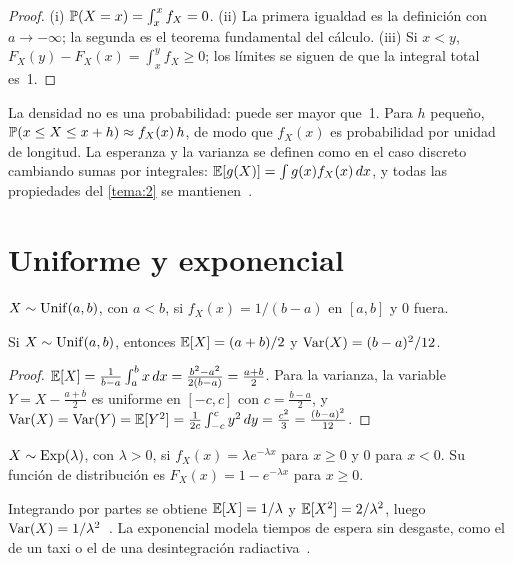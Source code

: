 \begin{proof}
(i) $\mathbb{P}(X=x)=\int_x^x f_X=0$. (ii) La primera igualdad es la definición con $a\to-\infty$; la segunda es el teorema fundamental del cálculo. (iii) Si $x<y$, $F_X(y)-F_X(x)=\int_x^y f_X\ge 0$; los límites se siguen de que la integral total es~1.
\end{proof}

La densidad no es una probabilidad: puede ser mayor que~1. Para $h$ pequeño, $\mathbb{P}(x\le X\le x+h)\approx f_X(x)\,h$, de modo que $f_X(x)$ es probabilidad por unidad de longitud. La esperanza y la varianza se definen como en el caso discreto cambiando sumas por integrales: $\mathbb{E}[g(X)]=\int g(x)f_X(x)\,dx$, y todas las propiedades del \cref{tema:2} se mantienen~\cite[§3.1]{bt}.

\section{Uniforme y exponencial}

\begin{definicion}[Uniforme]
$X\sim\operatorname{Unif}(a,b)$, con $a<b$, si $f_X(x)=1/(b-a)$ en $[a,b]$ y $0$ fuera.
\end{definicion}

\begin{proposicion}\label{prop:uniforme}
Si $X\sim\operatorname{Unif}(a,b)$, entonces $\mathbb{E}[X]=(a+b)/2$ y $\operatorname{Var}(X)=(b-a)^{2}/12$.
\end{proposicion}

\begin{proof}
$\mathbb{E}[X]=\frac{1}{b-a}\int_a^b x\,dx=\frac{b^{2}-a^{2}}{2(b-a)}=\frac{a+b}{2}$. Para la varianza, la variable $Y=X-\frac{a+b}{2}$ es uniforme en $[-c,c]$ con $c=\frac{b-a}{2}$, y $\operatorname{Var}(X)=\operatorname{Var}(Y)=\mathbb{E}[Y^{2}]=\frac{1}{2c}\int_{-c}^{c}y^{2}\,dy=\frac{c^{2}}{3}=\frac{(b-a)^{2}}{12}$.
\end{proof}

\begin{definicion}[Exponencial]
$X\sim\operatorname{Exp}(\lambda)$, con $\lambda>0$, si $f_X(x)=\lambda e^{-\lambda x}$ para $x\ge 0$ y $0$ para $x<0$. Su función de distribución es $F_X(x)=1-e^{-\lambda x}$ para $x\ge 0$.
\end{definicion}

Integrando por partes se obtiene $\mathbb{E}[X]=1/\lambda$ y $\mathbb{E}[X^{2}]=2/\lambda^{2}$, luego $\operatorname{Var}(X)=1/\lambda^{2}$~\cite[§3.1]{bt}. La exponencial modela tiempos de espera sin desgaste, como el de un taxi o el de una desintegración radiactiva~\cite[clase~5c]{mit1805}.

